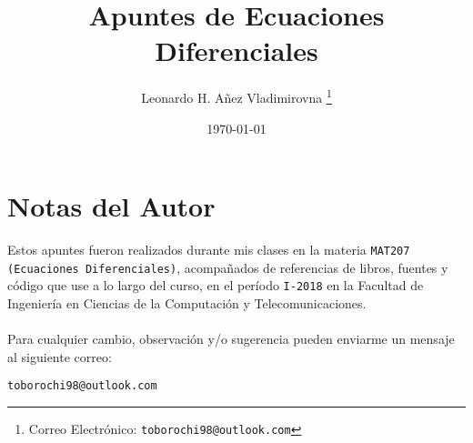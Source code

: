 

\title{Apuntes de Ecuaciones Diferenciales}

\author{Leonardo H. Añez Vladimirovna%
  \thanks{Correo Electrónico: \texttt{toborochi98@outlook.com}}}
\date{\today}

\maketitle


\section*{Notas del Autor}
Estos apuntes fueron realizados durante mis clases en la materia \texttt{MAT207 (Ecuaciones Diferenciales)}, acompañados de referencias de libros, fuentes y código que use a lo largo del curso, en el período \texttt{I-2018} en la Facultad de Ingeniería en Ciencias de la Computación y Telecomunicaciones. 
\\ \vspace{0.5cm} \\
Para cualquier cambio, observación y/o sugerencia pueden enviarme un mensaje al siguiente correo:
\begin{center}
 \texttt{toborochi98@outlook.com}
\end{center}

\tableofcontents
